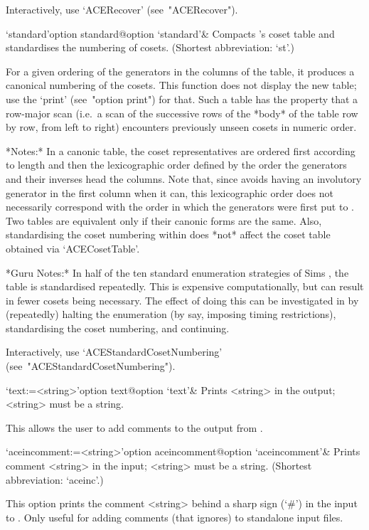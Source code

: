 Interactively, use `ACERecover' (see~"ACERecover").

\>`standard'{option standard}@{option `standard'}&
Compacts {\ACE}'s  coset  table  and  standardises  the  numbering  of
cosets. (Shortest abbreviation: `st'.)

For a given ordering of the generators in the columns of the table, it
produces a canonical numbering of the cosets. This function  does  not
display the new table; use the `print' (see~"option print") for  that.
Such a table has the property that a row-major scan  (i.e.~a  scan  of
the successive rows of the *body* of the table row by row,  from  left
to right) encounters previously unseen cosets in numeric order.

*Notes:*
In a canonic  table,  the  coset  representatives  are  ordered  first
according to length and then the lexicographic order  defined  by  the
order the generators and their inverses head the columns.  Note  that,
since {\ACE} avoids having an involutory generator in the first column
when it can, this lexicographic order does not necessarily  correspond
with the order in which the generators were first put to  {\ACE}.  Two
tables are equivalent only if their canonic forms are the same.  Also,
standardising the coset numbering within {\ACE} does *not* affect  the
{\GAP} coset table obtained via `ACECosetTable'.

*Guru Notes:*
In  half  of  the  ten  standard  enumeration   strategies   of   Sims
\cite{Sim94}, the table is standardised repeatedly. This is  expensive
computationally, but can result in fewer cosets being  necessary.  The
effect of doing this can be investigated  in  {\ACE}  by  (repeatedly)
halting  the  enumeration  (by  say,  imposing  timing  restrictions),
standardising the coset numbering, and continuing.

Interactively,             use             `ACEStandardCosetNumbering'
(see~"ACEStandardCosetNumbering").

\enditems


\beginitems

\>`text:=<string>'{option text}@{option `text'}&
Prints <string> in the output; <string> must be a string.

This allows the user to add comments to the output from {\ACE}.

\>`aceincomment:=<string>'{option aceincomment}@{option `aceincomment'}&
Prints comment <string> in the {\ACE} input; <string> must be a string.
(Shortest abbreviation: `aceinc'.)

This option prints the comment <string> behind a sharp sign (`\#')  in
the input to {\ACE}. Only useful  for  adding  comments  (that  {\ACE}
ignores) to standalone input files.

\enditems

